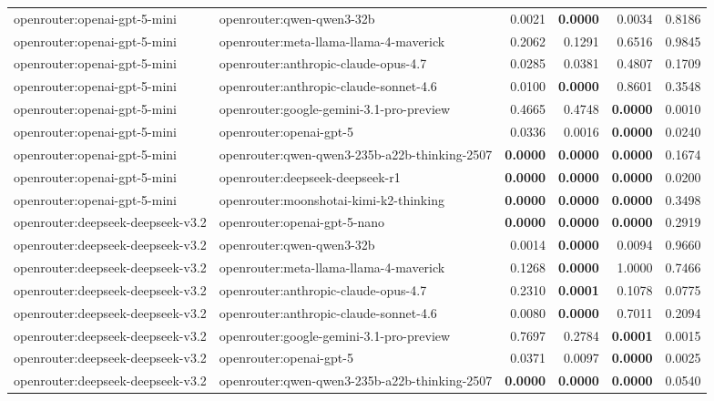 \begin{table}[t]
\begin{tabular}{llrrrr}
openrouter:openai-gpt-5-mini & openrouter:qwen-qwen3-32b & 0.0021 & \textbf{0.0000} & 0.0034 & 0.8186 \\
openrouter:openai-gpt-5-mini & openrouter:meta-llama-llama-4-maverick & 0.2062 & 0.1291 & 0.6516 & 0.9845 \\
openrouter:openai-gpt-5-mini & openrouter:anthropic-claude-opus-4.7 & 0.0285 & 0.0381 & 0.4807 & 0.1709 \\
openrouter:openai-gpt-5-mini & openrouter:anthropic-claude-sonnet-4.6 & 0.0100 & \textbf{0.0000} & 0.8601 & 0.3548 \\
openrouter:openai-gpt-5-mini & openrouter:google-gemini-3.1-pro-preview & 0.4665 & 0.4748 & \textbf{0.0000} & 0.0010 \\
openrouter:openai-gpt-5-mini & openrouter:openai-gpt-5 & 0.0336 & 0.0016 & \textbf{0.0000} & 0.0240 \\
openrouter:openai-gpt-5-mini & openrouter:qwen-qwen3-235b-a22b-thinking-2507 & \textbf{0.0000} & \textbf{0.0000} & \textbf{0.0000} & 0.1674 \\
openrouter:openai-gpt-5-mini & openrouter:deepseek-deepseek-r1 & \textbf{0.0000} & \textbf{0.0000} & \textbf{0.0000} & 0.0200 \\
openrouter:openai-gpt-5-mini & openrouter:moonshotai-kimi-k2-thinking & \textbf{0.0000} & \textbf{0.0000} & \textbf{0.0000} & 0.3498 \\
openrouter:deepseek-deepseek-v3.2 & openrouter:openai-gpt-5-nano & \textbf{0.0000} & \textbf{0.0000} & \textbf{0.0000} & 0.2919 \\
openrouter:deepseek-deepseek-v3.2 & openrouter:qwen-qwen3-32b & 0.0014 & \textbf{0.0000} & 0.0094 & 0.9660 \\
openrouter:deepseek-deepseek-v3.2 & openrouter:meta-llama-llama-4-maverick & 0.1268 & \textbf{0.0000} & 1.0000 & 0.7466 \\
openrouter:deepseek-deepseek-v3.2 & openrouter:anthropic-claude-opus-4.7 & 0.2310 & \textbf{0.0001} & 0.1078 & 0.0775 \\
openrouter:deepseek-deepseek-v3.2 & openrouter:anthropic-claude-sonnet-4.6 & 0.0080 & \textbf{0.0000} & 0.7011 & 0.2094 \\
openrouter:deepseek-deepseek-v3.2 & openrouter:google-gemini-3.1-pro-preview & 0.7697 & 0.2784 & \textbf{0.0001} & 0.0015 \\
openrouter:deepseek-deepseek-v3.2 & openrouter:openai-gpt-5 & 0.0371 & 0.0097 & \textbf{0.0000} & 0.0025 \\
openrouter:deepseek-deepseek-v3.2 & openrouter:qwen-qwen3-235b-a22b-thinking-2507 & \textbf{0.0000} & \textbf{0.0000} & \textbf{0.0000} & 0.0540 \\

\end{tabular}
\end{table}
